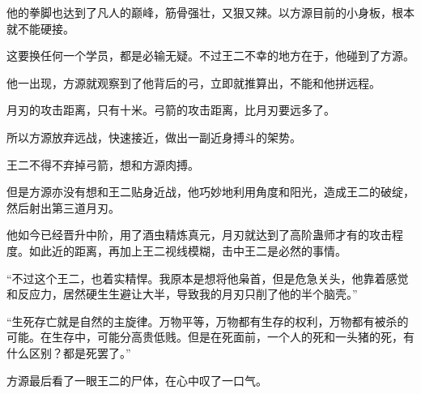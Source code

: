 \begin{this_body}
他的拳脚也达到了凡人的巅峰，筋骨强壮，又狠又辣。以方源目前的小身板，根本就不能硬接。

这要换任何一个学员，都是必输无疑。不过王二不幸的地方在于，他碰到了方源。

他一出现，方源就观察到了他背后的弓，立即就推算出，不能和他拼远程。

月刃的攻击距离，只有十米。弓箭的攻击距离，比月刃要远多了。

所以方源放弃远战，快速接近，做出一副近身搏斗的架势。

王二不得不弃掉弓箭，想和方源肉搏。

但是方源亦没有想和王二贴身近战，他巧妙地利用角度和阳光，造成王二的破绽，然后射出第三道月刃。

他如今已经晋升中阶，用了酒虫精炼真元，月刃就达到了高阶蛊师才有的攻击程度。如此近的距离，再加上王二视线模糊，击中王二是必然的事情。

“不过这个王二，也着实精悍。我原本是想将他枭首，但是危急关头，他靠着感觉和反应力，居然硬生生避让大半，导致我的月刃只削了他的半个脑壳。”

“生死存亡就是自然的主旋律。万物平等，万物都有生存的权利，万物都有被杀的可能。在生存中，可能分高贵低贱。但是在死面前，一个人的死和一头猪的死，有什么区别？都是死罢了。”

方源最后看了一眼王二的尸体，在心中叹了一口气。

\end{this_body}

